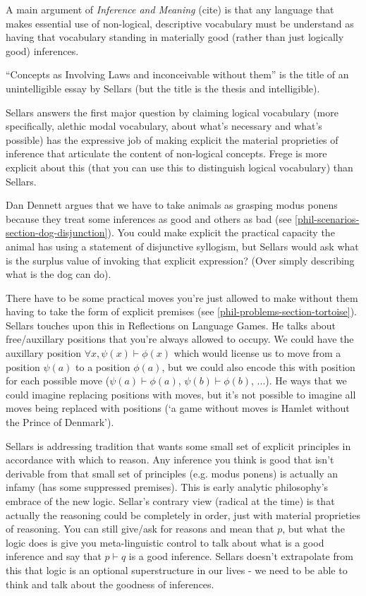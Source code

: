 
A main argument of \textit{Inference and Meaning} (cite) is that any language that makes essential use of non-logical, descriptive vocabulary must be understand as having that vocabulary standing in materially good (rather than just logically good) inferences.

``Concepts as Involving Laws and inconceivable without them'' is the title of an unintelligible essay by Sellars (but the title is the thesis and intelligible).

Sellars answers the first major question by claiming logical vocabulary (more specifically, alethic modal vocabulary, about what's necessary and what's possible) has the expressive job of making explicit the material proprieties of inference that articulate the content of non-logical concepts. Frege is more explicit about this (that you can use this to distinguish logical vocabulary) than Sellars.

Dan Dennett argues that we have to take animals as grasping modus ponens because they treat some inferences as good and others as bad (see \ref{phil-scenarios-section-dog-disjunction}). You could make explicit the practical capacity the animal has using a statement of disjunctive syllogism, but Sellars would ask what is the surplus value of invoking that explicit expression? (Over simply describing what is the dog can do).

There have to be some practical moves you're just allowed to make without them having to take the form of explicit premises (see \ref{phil-problems-section-tortoise}). Sellars touches upon this in Reflections on Language Games. He talks about free/auxillary positions that you're always allowed to occupy. We could have the auxillary position $\forall x, \psi(x)\vdash \phi(x)$ which would license us to move from a position $\psi(a)$ to a position $\phi(a)$, but we could also encode this with position for each possible move ($\psi(a)\vdash \phi(a)$, $\psi(b)\vdash\phi(b)$, ...). He ways that we could imagine replacing positions with moves, but it's not possible to imagine all moves being replaced with positions (`a game without moves is Hamlet without the Prince of Denmark').

Sellars is addressing tradition that wants some small set of explicit principles in accordance with which to reason. Any inference you think is good that isn't derivable from that small set of principles (e.g. modus ponens) is actually an infamy (has some suppressed premises). This is early analytic philosophy's embrace of the new logic. Sellar's contrary view (radical at the time) is that actually the reasoning could be completely in order, just with material proprieties of reasoning. You can still give/ask for reasons and mean that $p$, but what the logic does is give you meta-linguistic control to talk about what is a good inference and say that $p \vdash q$ is a good inference. Sellars doesn't extrapolate from this that logic is an optional superstructure in our lives - we need to be able to think and talk about the goodness of inferences.

